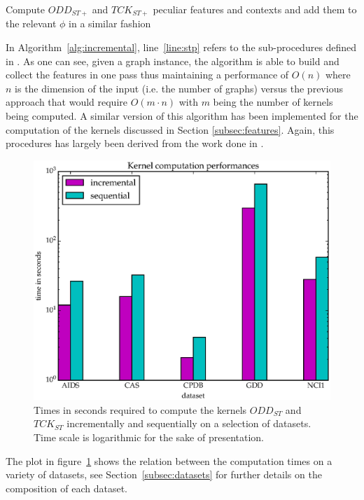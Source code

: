 \begin{algorithm}
\begin{algorithmic}[1]
                    \State Compute $ODD_{ST+}$ and $TCK_{ST+}$ peculiar features
                    and contexts and add them to the relevant $\phi$ in a similar
                    fashion\label{line:stp}
                \EndFor
            \EndFor
        \EndFor
    \end{algorithmic}
\end{algorithm}

In Algorithm~\ref{alg:incremental}, line~\ref{line:stp} refers to the sub-procedures
defined in \cite{nnavarin, rtesselli}.
As one can see, given a graph instance, the algorithm is able to build and
collect the features in one pass thus maintaining a performance of $O(n)$ where
$n$ is the dimension of the input (i.e. the number of graphs) versus the
previous approach that would require $O(m \cdot n)$ with $m$ being the number of
kernels being computed.
A similar version of this algorithm has been implemented for the computation
of the kernels discussed in Section \ref{subsec:features}.
Again, this procedures has largely been derived from the work done in \cite{nnavarin, rtesselli}.

\begin{figure}[ht]
    \centering
    \includegraphics[scale=0.5]{Figures/kernel_times_log}
    \caption{Times in seconds required to compute the kernels $ODD_{ST}$ and 
    $TCK_{ST}$ incrementally and sequentially on a selection of datasets. Time
    scale is logarithmic for the sake of presentation.}
    \label{fig:times}
\end{figure}

The plot in figure~\ref{fig:times} shows the relation between the computation times
on a variety of datasets, see Section~\ref{subsec:datasets} for further details on
the composition of each dataset.


